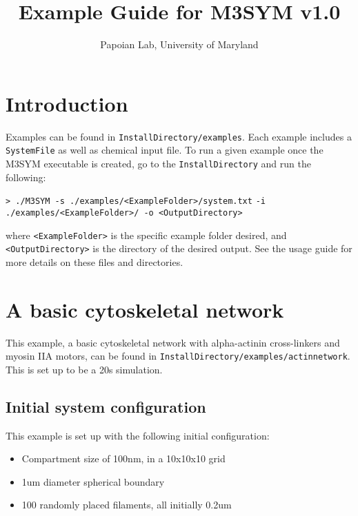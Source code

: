 \documentclass[11pt, oneside]{article}   	%
\title{Example Guide for M3SYM v1.0}
\author{Papoian Lab, University of Maryland}
\date{}							%
\begin{document}
\maketitle

\tableofcontents
\newpage

\section{Introduction}

Examples can be found in \texttt{InstallDirectory/examples}. Each example includes a \texttt{SystemFile} as well as chemical input file. To run a given example once the M3SYM executable is created, go to the \texttt{InstallDirectory} and run the following:\newline

\indent \texttt{> ./M3SYM -s ./examples/<ExampleFolder>/system.txt}\newline
\indent\indent \texttt{-i ./examples/<ExampleFolder>/  -o <OutputDirectory>}\newline

\noindent where \texttt{<ExampleFolder>} is the specific example folder desired, and \texttt{<OutputDirectory>} is the directory of the desired output. See the usage guide for more details on these files and directories.


\section{A basic cytoskeletal network}

This example, a basic cytoskeletal network with alpha-actinin cross-linkers and myosin IIA motors, can be found in
\texttt{InstallDirectory/examples/actinnetwork}. This is set up to be a 20s simulation.

\subsection{Initial system configuration}
 
 This example is set up with the following initial configuration:
 
 \begin{itemize}
 \item Compartment size of 100nm, in a 10x10x10 grid 
 \item 1um diameter spherical boundary
 \item 100 randomly placed filaments, all initially 0.2um
 \end{itemize}
\end{document}
